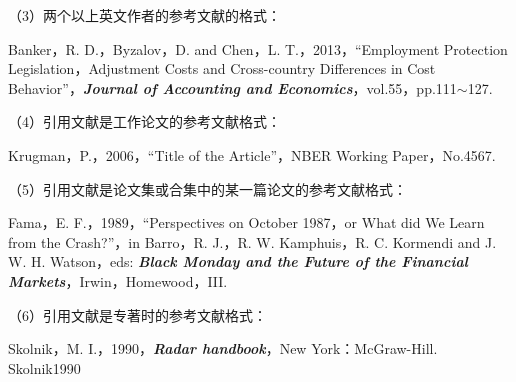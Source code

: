 \documentclass{article}
\begin{document}
（3）两个以上英文作者的参考文献的格式：

Banker，R. D.，Byzalov，D. and Chen，L. T.，2013，“Employment Protection
Legislation，Adjustment Costs and Cross-country Differences in Cost Behavior”，\textbf{\textit{Journal
of Accounting and Economics}}，vol.55，pp.111$\sim$127.

（4）引用文献是工作论文的参考文献格式：

Krugman，P.，2006，“Title of the Article”，NBER Working Paper，No.4567.

（5）引用文献是论文集或合集中的某一篇论文的参考文献格式：

Fama，E. F.，1989，“Perspectives on October 1987，or What did We Learn from the
Crash?”，in Barro，R. J.，R. W. Kamphuis，R. C. Kormendi and J. W. H. Watson，eds:
\textbf{\textit{Black Monday and the Future of the Financial Markets}}，Irwin，Homewood，III.

（6）引用文献是专著时的参考文献格式：

Skolnik，M. I.，1990，\textbf{\textit{Radar handbook}}，New York：McGraw-Hill.
Skolnik1990

\newpage
{
    \printbibliography

}

    
\end{document}

